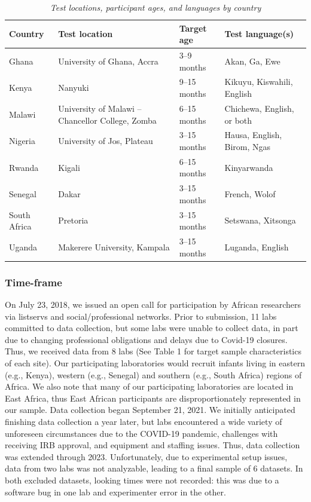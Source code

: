 \documentclass[
  ,man,floatsintext]{apa6}
\begin{document}
\begin{table}[!t]
\caption{\textit{Test locations, participant ages, and languages by country}}
\label{tab:test_locations}
\centering
\begin{tabularx}{\textwidth}{lXlX}
\toprule
\textbf{Country} & \textbf{Test location} & \textbf{Target age} & \textbf{Test language(s)} \\
\midrule
Ghana & University of Ghana, Accra & 3--9 months & Akan, Ga, Ewe \\
Kenya & Nanyuki & 9--15 months & Kikuyu, Kiswahili, English \\
Malawi & University of Malawi -- Chancellor College, Zomba & 6--15 months & Chichewa, English, or both \\
Nigeria & University of Jos, Plateau & 3--15 months & Hausa, English, Birom, Ngas \\
Rwanda & Kigali & 6--15 months & Kinyarwanda \\
Senegal & Dakar & 3--15 months & French, Wolof \\
South Africa & Pretoria & 3--15 months & Setswana, Xitsonga \\
Uganda & Makerere University, Kampala & 3--15 months & Luganda, English \\
\bottomrule
\end{tabularx}
\end{table}

\hypertarget{time-frame}{%
\subsubsection{Time-frame}\label{time-frame}}

On July 23, 2018, we issued an open call for participation by African researchers via listservs and social/professional networks. Prior to submission, 11 labs committed to data collection, but some labs were unable to collect data, in part due to changing professional obligations and delays due to Covid-19 closures. Thus, we received data from 8 labs (See Table 1 for target sample characteristics of each site). Our participating laboratories would recruit infants living in eastern (e.g., Kenya), western (e.g., Senegal) and southern (e.g., South Africa) regions of Africa. We also note that many of our participating laboratories are located in East Africa, thus East African participants are disproportionately represented in our sample. Data collection began September 21, 2021. We initially anticipated finishing data collection a year later, but labs encountered a wide variety of unforeseen circumstances due to the COVID-19 pandemic, challenges with receiving IRB approval, and equipment and staffing issues. Thus, data collection was extended through 2023. Unfortunately, due to experimental setup issues, data from two labs was not analyzable, leading to a final sample of 6 datasets. In both excluded datasets, looking times were not recorded: this was due to a software bug in one lab and experimenter error in the other.
\end{document}
